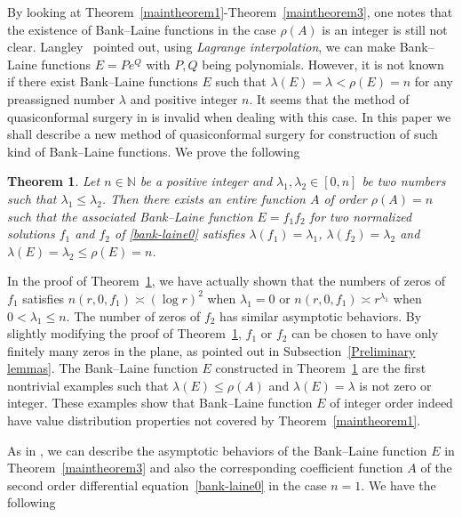 \documentclass[12pt]{amsart}
\numberwithin{equation}{section}
\newtheorem{theorem}{Theorem}[section]
\begin{document}
By looking at Theorem~\ref{maintheorem1}-Theorem~\ref{maintheorem3}, one notes that the existence of Bank--Laine functions in the case $\rho(A)$ is an integer is still not clear. Langley~\cite{Langley1998-99} pointed out, using \emph{Lagrange interpolation}, we can make Bank--Laine functions $E=Pe^{Q}$ with $P,Q$ being polynomials. However, it is not known if there exist Bank--Laine functions $E$ such that $\lambda(E)=\lambda<\rho(E)=n$ for any preassigned number $\lambda$ and positive integer $n$. It seems that the method of quasiconformal surgery in \cite[Subsection~5.3]{Bergweilereremenko2019} is invalid when dealing with this case. In this paper we shall describe a new method of quasiconformal surgery for construction of such kind of Bank--Laine functions. We prove the following

\begin{theorem}\label{maintheorem4}
Let $n\in \mathbb{N}$ be a positive integer and $\lambda_1,\lambda_2\in[0,n]$ be two numbers such that $\lambda_1\leq \lambda_2$. Then there exists an entire function $A$ of order $\rho(A)=n$ such that the associated Bank--Laine function $E=f_1f_2$ for two normalized solutions $f_1$ and $f_2$ of \eqref{bank-laine0} satisfies $\lambda(f_1)=\lambda_1$, $\lambda(f_2)=\lambda_2$ and $\lambda(E)=\lambda_2\leq \rho(E)=n$.
\end{theorem}

In the proof of Theorem~\ref{maintheorem4}, we have actually shown that the numbers of zeros of $f_1$ satisfies $n(r,0,f_1)\asymp (\log r)^2$ when $\lambda_1=0$ or $n(r,0,f_1)\asymp r^{\lambda_1}$ when $0<\lambda_1\leq n$. The number of zeros of $f_2$ has similar asymptotic behaviors. By slightly modifying the proof of Theorem~\ref{maintheorem4}, $f_1$ or $f_2$ can be chosen to have only finitely many zeros in the plane, as pointed out in Subsection~\ref{Preliminary lemmas}. The Bank--Laine function $E$ constructed in Theorem~\ref{maintheorem4} are the first nontrivial examples such that $\lambda(E)\leq \rho(A)$ and $\lambda(E)=\lambda$ is not zero or integer. These examples show that Bank--Laine function $E$ of integer order indeed have value distribution properties not covered by Theorem~\ref{maintheorem1}.

As in \cite[Theorem~3]{Zhang2024}, we can describe the asymptotic behaviors of the Bank--Laine function $E$ in Theorem~\ref{maintheorem3} and also the corresponding coefficient function $A$ of the second order differential equation~\eqref{bank-laine0} in the case $n=1$. We have the following
\end{document}
